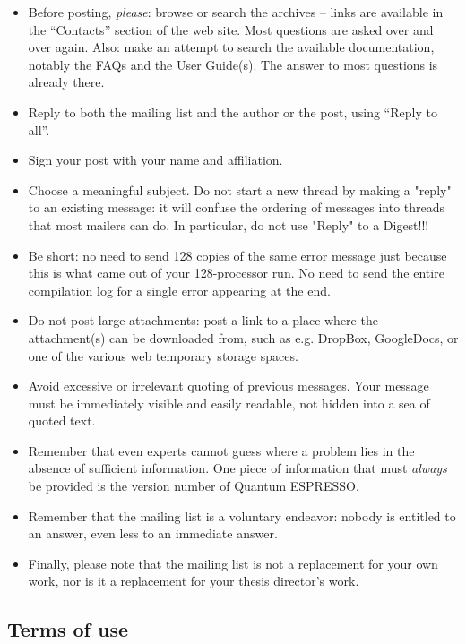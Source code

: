 \documentclass[12pt,a4paper]{article}
\def\qe{{\sc Quantum ESPRESSO}}
\begin{document}
\begin{itemize}
\item Before posting, {\em please}: browse or search the archives --
  links are available in the ``Contacts'' section  of the   web site.
  Most questions are asked over and over again. Also: make an attempt
  to search the
  available documentation, notably the FAQs and the User Guide(s).
  The answer to most questions is already there.
\item Reply to both the mailing list and the author or the post, using
  ``Reply to all''.
\item Sign your post with your name and affiliation.
\item Choose a meaningful subject. Do not start a new thread by making
      a	"reply" to an existing message: it will confuse the ordering of
      messages into threads that most mailers can do. In particular, do
      not use "Reply" to a Digest!!!
\item Be short: no need to send 128 copies of the same error message just
  because this is what came out of your 128-processor run. No need to
  send the entire compilation log for a single error appearing at the end.
\item Do not post large attachments: post a link to a place where the
  attachment(s) can be downloaded from, such as e.g. DropBox, GoogleDocs,
  or one of the various web temporary storage spaces.
\item Avoid excessive or irrelevant quoting of previous messages. Your
  message must be immediately visible and easily readable, not hidden
  into a sea of quoted text.
\item Remember that even experts cannot guess where a problem lies in
  the absence of sufficient information. One piece of information that
  must {\em always} be provided is the version number of \qe.
\item Remember that the mailing list is a voluntary endeavor: nobody is
  entitled to an answer, even less to an immediate answer.
\item Finally, please note that the mailing list is not a replacement
  for your own work, nor is it a replacement for your thesis director's
  work.
\end{itemize}

\subsection{Terms of use}
\label{SubSec:Terms}
\end{document}
